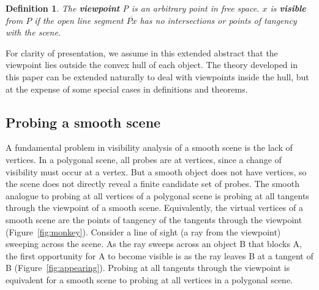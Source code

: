 \documentclass[10pt,twocolumn]{article}
\newcommand{\Comment}[1]{\relax}  %
\newcommand{\seg}[1]{\mbox{$\overline{#1}$}}
\newtheorem{defn2}{Definition}
\newif\ifJournal
\begin{document}
\begin{defn2}
The {\bf viewpoint} P is an arbitrary point in free space.
$x$ is {\bf visible} from $P$ if the open line segment \seg{Px} 
has no intersections or points of tangency with the scene.
\end{defn2}

For clarity of presentation, we assume in this extended abstract that
the viewpoint lies outside the convex hull of each object.
The theory developed in this paper can be extended naturally to deal
with viewpoints inside the hull, but at the expense of some special 
cases in definitions %
and theorems.

\subsection{Probing a smooth scene}

A fundamental problem in visibility analysis of a smooth scene is the lack
of vertices.
In a polygonal scene, all probes are at vertices, since a change of visibility
must occur at a vertex.
But a smooth object does not have vertices, so the scene does not directly 
reveal a finite candidate set of probes.
The smooth analogue to probing at all vertices of a polygonal scene
is probing at all tangents through the viewpoint of a smooth scene.
Equivalently, the virtual vertices of a smooth scene are 
the points of tangency of the tangents through the viewpoint (Figure~\ref{fig:monkey}).
Consider a line of sight (a ray from the viewpoint) sweeping across the scene. 
As the ray sweeps across an object B that blocks A, the first opportunity
for A to become visible is as the ray leaves B at a tangent of B (Figure~\ref{fig:appearing}).
\Comment{
  Since A may appear from behind part of B but still
  in front of other parts of B (FIGURE), 
  the ray may not leave B altogether at this first visibility; 
  nevertheless, the ray will be tangent to this front concavity of B.
}
Probing at all tangents through the viewpoint is equivalent for a smooth scene
to probing at all vertices in a polygonal scene.
\end{document}
